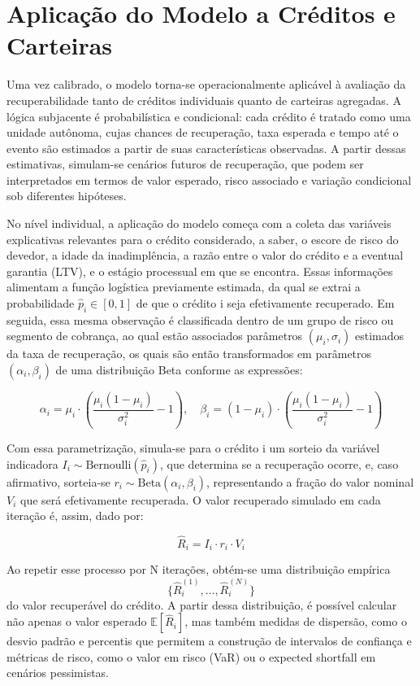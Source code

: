 \documentclass[a4paper,12pt]{article}
\begin{document}
\section{Aplicação do Modelo a Créditos e Carteiras}
Uma vez calibrado, o modelo torna-se operacionalmente aplicável à avaliação da recuperabilidade tanto de créditos individuais quanto de carteiras agregadas. A lógica subjacente é probabilística e condicional: cada crédito é tratado como uma unidade autônoma, cujas chances de recuperação, taxa esperada e tempo até o evento são estimados a partir de suas características observadas. A partir dessas estimativas, simulam-se cenários futuros de recuperação, que podem ser interpretados em termos de valor esperado, risco associado e variação condicional sob diferentes hipóteses.

No nível individual, a aplicação do modelo começa com a coleta das variáveis explicativas relevantes para o crédito considerado, a saber, o escore de risco do devedor, a idade da inadimplência, a razão entre o valor do crédito e a eventual garantia (LTV), e o estágio processual em que se encontra. Essas informações alimentam a função logística previamente estimada, da qual se extrai a probabilidade 
$\hat{p}_{i} \in [0,1]$ de que o crédito i seja efetivamente recuperado. Em seguida, essa mesma observação é classificada dentro de um grupo de risco ou segmento de cobrança, ao qual estão associados parâmetros 
$(\mu_i,\sigma_i)$ estimados da taxa de recuperação, os quais são então transformados em parâmetros 
$(\alpha_i,\beta_i)$ de uma distribuição Beta conforme as expressões:

\[ \alpha_i = \mu_i \cdot \left( \frac{\mu_i (1 - \mu_i)}{\sigma_i^2} - 1 \right), \quad \beta_i = (1 - \mu_i) \cdot \left( \frac{\mu_i (1 - \mu_i)}{\sigma_i^2} - 1 \right) \]

Com essa parametrização, simula-se para o crédito i um sorteio da variável indicadora $I_i \sim \text{Bernoulli}(\hat{p}_{i})$, que determina se a recuperação ocorre, e, caso afirmativo, sorteia-se 
$r_i \sim \text{Beta}(\alpha_i, \beta_i)$, representando a fração do valor nominal $V_i$ que será efetivamente recuperada. O valor recuperado simulado em cada iteração é, assim, dado por:

\[ \hat{R}_i = I_i \cdot r_i \cdot V_i \]
 
Ao repetir esse processo por N iterações, obtém-se uma distribuição empírica \[\{ \hat{R}_i^{(1)}, \dots, \hat{R}_i^{(N)} \}\] do valor recuperável do crédito. A partir dessa distribuição, é possível calcular não apenas o valor esperado 
$\mathbb{E}[\hat{R}_i]$, mas também medidas de dispersão, como o desvio padrão e percentis que permitem a construção de intervalos de confiança e métricas de risco, como o valor em risco (VaR) ou o expected shortfall em cenários pessimistas.
\end{document}
